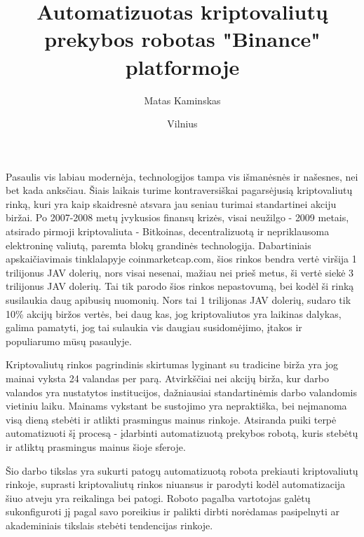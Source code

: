 \documentclass{VUMIFInfKursinis}
\institute{Informatikos institutas}  %
\title{Automatizuotas kriptovaliutų prekybos robotas "Binance" platformoje}
\author{Matas Kaminskas}
\date{Vilnius \\ \the\year}
\begin{document}
\maketitle

\tableofcontents

Pasaulis vis labiau modernėja, technologijos tampa vis išmanėsnės ir našesnes, nei bet kada anksčiau. Šiais laikais turime kontraversiškai pagarsėjusią
kriptovaliutų rinką, kuri yra kaip skaidresnė atsvara jau seniau turimai standartinei akciju biržai. Po 2007-2008 metų įvykusios finansų krizės, 
visai neužilgo - \cite{SatBitcoin}2009 metais, atsirado pirmoji kriptovaliuta - Bitkoinas, decentralizuotą ir nepriklausoma elektroninę valiutą, paremta
blokų grandinės technologija. Dabartiniais apskaičiavimais tinklalapyje coinmarketcap.com, šios rinkos bendra vertė viršija 1 trilijonus JAV dolerių, 
nors visai nesenai, mažiau nei prieš metus, ši vertė siekė 3 trilijonus JAV dolerių. Tai tik parodo šios rinkos nepastovumą, bei kodėl ši rinką susilaukia
daug apibusių nuomonių. Nors tai 1 trilijonas JAV dolerių, sudaro tik 10\% akcijų biržos vertės, bei daug kas, jog kriptovaliutos yra laikinas dalykas,
galima pamatyti, jog tai sulaukia vis daugiau susidomėjimo, įtakos ir populiarumo mūsų pasaulyje.     

Kriptovaliutų rinkos pagrindinis skirtumas lyginant su tradicine birža yra jog mainai vyksta 24 valandas per parą. Atvirkščiai nei akcijų birža, kur 
darbo valandos yra nustatytos institucijos, dažniausiai standartinėmis darbo valandomis vietiniu laiku. Mainams vykstant be sustojimo yra nepraktiška, 
bei neįmanoma visą dieną stebėti ir atlikti prasmingus mainus rinkoje. Atsiranda puiki terpė automatizuoti šį procesą - įdarbinti automatizuotą prekybos 
robotą, kuris stebėtų ir atliktų prasmingus mainus šioje sferoje.

Šio darbo tikslas yra sukurti patogų automatizuotą robota prekiauti kriptovaliutų rinkoje, suprasti kriptovaliutų rinkos niuansus ir parodyti kodėl 
automatizacija šiuo atveju yra reikalinga bei patogi. Roboto pagalba vartotojas galėtų sukonfiguroti jį pagal savo poreikius ir palikti dirbti norėdamas 
pasipelnyti ar akademiniais tikslais stebėti tendencijas rinkoje.
\end{document}
